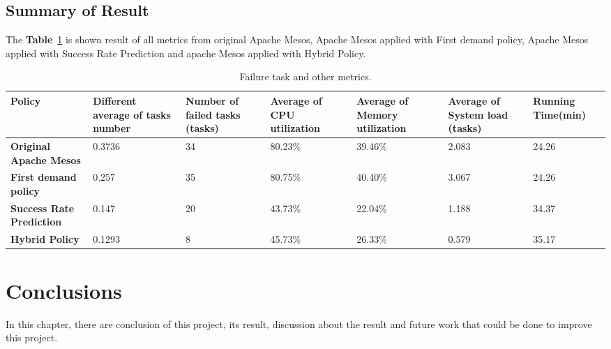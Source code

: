 \documentclass[12pt,oneside,openright,a4paper]{cpe-english-project}
\begin{document}
\section{Summary of Result}  
\hspace{10mm}The \textbf{Table}~\ref{tbl:chap4Sum} is shown result of all metrics from original Apache Mesos, Apache Mesos applied with First demand policy, Apache Mesos applied with Success Rate Prediction and apache Mesos applied with Hybrid Policy.
  \begin{table}[!h]
  \caption{Failure task and other metrics.}\label{tbl:chap4Sum}
  \begin{tabular}{@{}|p{}|p{}|p{}|p{}|p{}|p{}|p{}|}
   \hline
   \textbf{Policy} & \textbf{Different average of tasks number} & \textbf{Number of failed tasks (tasks)} & \textbf{Average of CPU utilization} & \textbf{Average of Memory utilization} & \textbf{Average of System load (tasks)} & \textbf{Running Time(min)} \\
   \hline
   \textbf{Original Apache Mesos}& 0.3736 & 34& 80.23\% & 39.46\% &2.083& 24.26 \\
   \hline
   \textbf{First demand policy} & 0.257& 35& 80.75\% & 40.40\% & 3.067& 24.26\\
   \hline
   \textbf{Success Rate Prediction}& 0.147& 20& 43.73\% & 22.04\%& 1.188& 34.37 \\
   \hline
   \textbf{Hybrid Policy} & 0.1293 & 8 & 45.73\% & 26.33\% & 0.579  & 35.17 \\ 
   \hline                   
  \end{tabular}
\end{table}


\chapter{Conclusions}

\hspace{10mm}In this chapter, there are conclusion of this project, its result, discussion about the result and future work that could be done to improve this project.

\end{document}

